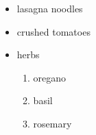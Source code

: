 \begin{itemize}
  \item lasagna noodles
  \item crushed tomatoes
  \item herbs \begin{enumerate}
    \item oregano
    \item basil
    \item rosemary
  \end{enumerate}
\end{itemize}
